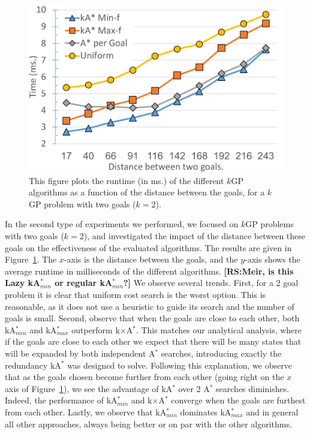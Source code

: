 \documentclass{aicom2e}
\newcommand{\kgs}{$k$GP}
\newcommand{\astar}{A$^*$}
\newcommand{\kastar}{kA$^*$}
\newcommand{\kastarmin}{kA$^*_{min}$}
\newcommand{\kastarmax}{kA$^*_{max}$}
\newcommand{\kxastar}{k$\times$A$^*$}
\newcommand{\roni}[1]{\textbf{[RS:#1]}}
\begin{document}
\begin{figure}
    \includegraphics[width=\columnwidth]{G0-G1_cropped.pdf}
    \caption{This figure plots the runtime (in ms.) of the different \kgs{} algorithms as a function of the distance between the goals, for a \kgs{} problem with two goals ($k=2$).}
    \label{fig:2-goal}
\end{figure}
In the second type of experiments we performed, we focused on \kgs{} problems with two goals ($k=2$), and investigated the impact of the distance between these goals on the effectiveness of the evaluated algorithms.
The results are given in Figure~\ref{fig:2-goal}. The $x$-axis is the distance between the goals, and the $y$-axis shows the average runtime in milliseconds of the different algorithms.
\roni{Meir, is this Lazy \kastarmin{} or regular \kastarmin{}?}
We observe several trends.
First, for a 2 goal problem it is clear that uniform cost search is the worst option.
This is reasonable, as it does not use a heuristic to guide its search and the number of goals is small.
Second, observe that when the goals are close to each other, both \kastarmin{}
and \kastarmax{} outperform \kxastar{}. This matches our analytical analysis, where if the goals are close to each other we expect that there will be many states that will be expanded by both independent \astar{} searches, introducing exactly the redundancy \kastar{} was designed to solve.
Following this explanation, we observe that as the goals chosen become further from each other (going right on the $x$ axis of Figure~\ref{fig:2-goal}), we see the advantage of \kastar{} over 2 \astar{} searches diminishes. Indeed, the performance of \kastarmin{}  and \kxastar{} converge when the goals are furthest from each other.
Lastly, we observe that \kastarmin{} dominates \kastarmax{} and in general all other approaches, always being better or on par with the other algorithms.
\end{document}

